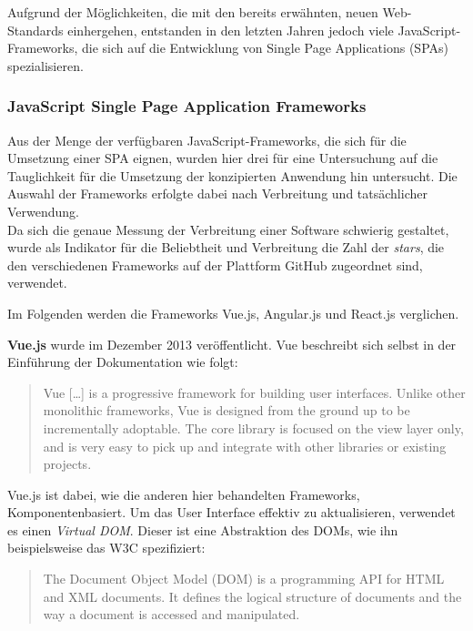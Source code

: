 Aufgrund der Möglichkeiten, die mit den bereits erwähnten, neuen Web-Standards einhergehen, entstanden in den letzten Jahren jedoch viele JavaScript-Frameworks, die sich auf die Entwicklung von Single Page Applications (SPAs) spezialisieren.


\subsubsection{JavaScript Single Page Application Frameworks}

Aus der Menge der verfügbaren JavaScript-Frameworks, die sich für die Umsetzung einer SPA eignen, wurden hier drei für eine Untersuchung auf die Tauglichkeit für die Umsetzung der konzipierten Anwendung hin untersucht.
Die Auswahl der Frameworks erfolgte dabei nach Verbreitung und tatsächlicher Verwendung.\\
Da sich die genaue Messung der Verbreitung einer Software schwierig gestaltet, wurde als Indikator für die Beliebtheit und Verbreitung die Zahl der \textit{stars}\footnotemark{}, die den verschiedenen Frameworks auf der Plattform GitHub  zugeordnet sind, verwendet.


Im Folgenden werden die Frameworks Vue.js, Angular.js und React.js verglichen.

\textbf{Vue.js} \cite{vue} wurde im Dezember 2013 veröffentlicht.
Vue beschreibt sich selbst in der Einführung der Dokumentation wie folgt:

\begin{quote}
  Vue […] is a progressive framework for building user interfaces. Unlike other monolithic frameworks, Vue is designed from the ground up to be incrementally adoptable. The core library is focused on the view layer only, and is very easy to pick up and integrate with other libraries or existing projects. \cite{VueIntro}
\end{quote}

Vue.js ist dabei, wie die anderen hier behandelten Frameworks, Komponentenbasiert. Um das User Interface effektiv zu aktualisieren, verwendet es einen \textit{Virtual DOM}. Dieser ist eine Abstraktion des DOMs, wie ihn beispielsweise das W3C spezifiziert:

\begin{quote}
  The Document Object Model (DOM) is a programming API for HTML and XML documents. It defines the logical structure of documents and the way a document is accessed and manipulated.  \cite{w3cDOM}
\end{quote}

